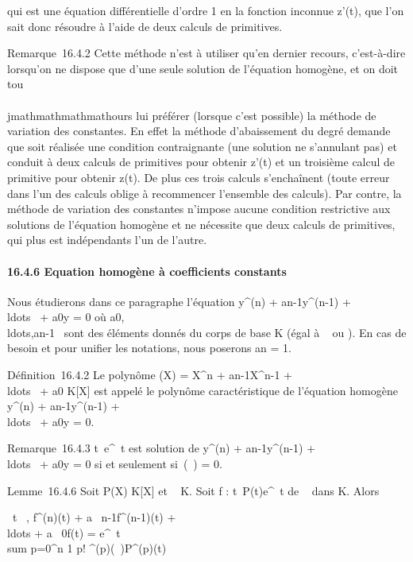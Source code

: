 qui est une équation différentielle d'ordre 1 en la fonction inconnue
z'(t), que l'on sait donc résoudre à l'aide de deux calculs de
primitives.

Remarque~16.4.2 Cette méthode n'est à utiliser qu'en dernier recours,
c'est-à-dire lorsqu'on ne dispose que d'une seule solution de l'équation
homogène, et on doit tou\\\\jmathmathmathmathours lui préférer (lorsque c'est possible) la
méthode de variation des constantes. En effet la méthode d'abaissement
du degré demande que soit réalisée une condition contraignante (une
solution ne s'annulant pas) et conduit à deux calculs de primitives pour
obtenir z'(t) et un troisième calcul de primitive pour obtenir z(t). De
plus ces trois calculs s'enchaînent (toute erreur dans l'un des calculs
oblige à recommencer l'ensemble des calculs). Par contre, la méthode de
variation des constantes n'impose aucune condition restrictive aux
solutions de l'équation homogène et ne nécessite que deux calculs de
primitives, qui plus est indépendants l'un de l'autre.

\paragraph{16.4.6 Equation homogène à coefficients constants}

Nous étudierons dans ce paragraphe l'équation y^(n) +
an-1y^(n-1) +
\\ldots~ +
a0y = 0 où
a0,\\ldots,an-1~
sont des éléments donnés du corps de base K (égal à ~ ou ). En cas de
besoin et pour unifier les notations, nous poserons an = 1.

Définition~16.4.2 Le polynôme \chi(X) = X^n +
an-1X^n-1 +
\\ldots~ +
a0 \in K{[}X{]} est appelé le polynôme caractéristique de
l'équation homogène y^(n) + an-1y^(n-1)
+ \\ldots~ +
a0y = 0.

Remarque~16.4.3 t\mapsto~e^\lambda~t est
solution de y^(n) + an-1y^(n-1) +
\\ldots~ +
a0y = 0 si et seulement si~\chi(\lambda~) = 0.

Lemme~16.4.6 Soit P(X) \in K{[}X{]} et \lambda~ \in K. Soit f :
t\mapsto~P(t)e^\lambda~t de ~ dans K. Alors

\forall~t \in {}~, f^(n)(t) + a~
n-1f^(n-1)(t) +
\\ldots + a~
0f(t) = e^\lambda~t \\sum
p=0^n 1 \over p!
\chi^(p)(\lambda~)P^(p)(t)

